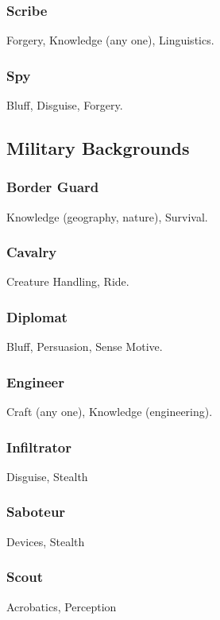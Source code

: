 \subsubsection{Scribe}
 Forgery, Knowledge (any one), Linguistics.

\subsubsection{Spy}
 Bluff, Disguise, Forgery.

\subsection{Military Backgrounds}

\subsubsection{Border Guard}
 Knowledge (geography, nature), Survival.

\subsubsection{Cavalry}
 Creature Handling, Ride.

\subsubsection{Diplomat}
 Bluff, Persuasion, Sense Motive.

\subsubsection{Engineer}
 Craft (any one), Knowledge (engineering).

\subsubsection{Infiltrator}
 Disguise, Stealth

\subsubsection{Saboteur}
 Devices, Stealth

\subsubsection{Scout}
 Acrobatics, Perception


